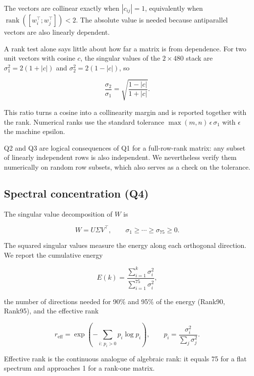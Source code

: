 \documentclass[11pt,a4paper]{article}
\begin{document}
The vectors are collinear exactly when $|c_{ij}| = 1$, equivalently when
$\operatorname{rank}([w_i^\top; w_j^\top]) < 2$. The absolute value is needed
because antiparallel vectors are also linearly dependent.

A rank test alone says little about how far a matrix is from dependence. For two
unit vectors with cosine $c$, the singular values of the $2 \times 480$ stack are
$\sigma_1^2 = 2(1+|c|)$ and $\sigma_2^2 = 2(1-|c|)$, so

\begin{equation}
\frac{\sigma_2}{\sigma_1} = \sqrt{\frac{1-|c|}{1+|c|}}.
\end{equation}

This ratio turns a cosine into a collinearity margin and is reported together with
the rank. Numerical ranks use the standard tolerance
$\max(m,n)\,\epsilon\,\sigma_1$ with $\epsilon$ the machine epsilon.

Q2 and Q3 are logical consequences of Q1 for a full-row-rank matrix: any subset of
linearly independent rows is also independent. We nevertheless verify them
numerically on random row subsets, which also serves as a check on the tolerance.

\subsection{Spectral concentration (Q4)}

The singular value decomposition of $W$ is

\begin{equation}
W = U \Sigma V^\top, \qquad \sigma_1 \geq \cdots \geq \sigma_{75} \geq 0 .
\end{equation}

The squared singular values measure the energy along each orthogonal direction. We
report the cumulative energy

\begin{equation}
E(k) = \frac{\sum_{i=1}^{k}\sigma_i^2}{\sum_{i=1}^{75}\sigma_i^2},
\end{equation}

the number of directions needed for 90\% and 95\% of the energy (Rank90, Rank95),
and the effective rank

\begin{equation}
r_{\mathrm{eff}} = \exp\left(-\sum_{i:\,p_i>0} p_i \log p_i\right),
\qquad p_i = \frac{\sigma_i^2}{\sum_j \sigma_j^2}.
\end{equation}

Effective rank is the continuous analogue of algebraic rank: it equals 75 for a
flat spectrum and approaches 1 for a rank-one matrix.
\end{document}
